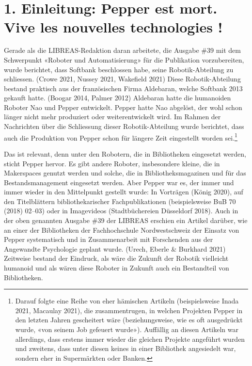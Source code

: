 \documentclass[a4paper,
fontsize=11pt,
oneside,
numbers=noperiodatend,
parskip=half-,
bibliography=totoc,
final
]{scrartcl}
\begin{document}
\hypertarget{einleitung-pepper-est-mort.-vive-les-nouvelles-technologies}{%
\section{1. Einleitung: Pepper est mort. Vive les nouvelles
technologies
!}\label{einleitung-pepper-est-mort.-vive-les-nouvelles-technologies}}

Gerade als die LIBREAS-Redaktion daran arbeitete, die Ausgabe \#39 mit
dem Schwerpunkt «Roboter und Automatisierung» für die Publikation
vorzubereiten, wurde berichtet, dass Softbank beschlossen habe, seine
Robotik-Abteilung zu schliessen. (Crowe 2021, Nussey 2021, Wakefield
2021) Diese Robotik-Abteilung bestand praktisch aus der französischen
Firma Aldebaran, welche Softbank 2013 gekauft hatte. (Boogar 2014,
Palmer 2012) Aldebaran hatte die humanoiden Roboter Nao und Pepper
entwickelt. Pepper hatte Nao abgelöst, der wohl schon länger nicht mehr
produziert oder weiterentwickelt wird. Im Rahmen der Nachrichten über
die Schliessung dieser Robotik-Abteilung wurde berichtet, dass auch die
Produktion von Pepper schon für längere Zeit eingestellt worden
sei.\footnote{Darauf folgte eine Reihe von eher hämischen Artikeln
  (beispielsweise Inada 2021, Macaulay 2021), die zusammentrugen, in
  welchen Projekten Pepper in den letzten Jahren gescheitert wäre
  (beziehungsweise, wie es oft ausgedrückt wurde, «von seinem Job
  gefeuert wurde»). Auffällig an diesen Artikeln war allerdings, dass
  erstens immer wieder die gleichen Projekte angeführt wurden und
  zweitens, dass unter diesen keines in einer Bibliothek angesiedelt
  war, sondern eher in Supermärkten oder Banken.}

Das ist relevant, denn unter den Robotern, die in Bibliotheken
eingesetzt werden, sticht Pepper hervor. Es gibt andere Roboter,
insbesondere kleine, die in Makerspaces genutzt werden und solche, die
in Bibliotheksmagazinen und für das Bestandsmanagement eingesetzt
werden. Aber Pepper war es, der immer und immer wieder in den
Mittelpunkt gestellt wurde: In Vorträgen (König 2020), auf den
Titelblättern bibliothekarischer Fachpublikationen (beispielsweise BuB
70 (2018) 02--03) oder in Imagevideos (Stadtbüchereien Düsseldorf 2018).
Auch in der oben genannten Ausgabe \#39 der LIBREAS erschien ein Artikel
darüber, wie an einer der Bibliotheken der Fachhochschule
Nordwestschweiz der Einsatz von Pepper systematisch und in
Zusammenarbeit mit Forschenden aus der Angewandte Psychologie geplant
wurde. (Urech, Eberle \& Burkhard 2021) Zeitweise bestand der Eindruck,
als wäre die Zukunft der Robotik vielleicht humanoid und als wären diese
Roboter in Zukunft auch ein Bestandteil von Bibliotheken.
\end{document}
